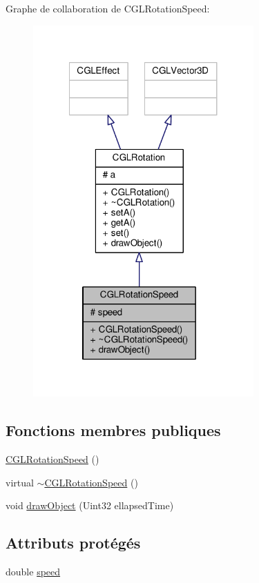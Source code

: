 Graphe de collaboration de C\-G\-L\-Rotation\-Speed\-:
\nopagebreak
\begin{figure}[H]
\begin{center}
\leavevmode
\includegraphics[width=239pt]{d1/dfb/class_c_g_l_rotation_speed__coll__graph}
\end{center}
\end{figure}
\subsection*{Fonctions membres publiques}
\begin{DoxyCompactItemize}
\item 
\hyperlink{class_c_g_l_rotation_speed_a6aed31b80ba1f7e050500469bf62e588}{C\-G\-L\-Rotation\-Speed} ()
\item 
virtual \hyperlink{class_c_g_l_rotation_speed_a7648604709da051825044630da6db987}{$\sim$\-C\-G\-L\-Rotation\-Speed} ()
\item 
void \hyperlink{class_c_g_l_rotation_speed_a6549d856fc0ad620fd1507744104797f}{draw\-Object} (Uint32 ellapsed\-Time)
\end{DoxyCompactItemize}
\subsection*{Attributs protégés}
\begin{DoxyCompactItemize}
\item 
double \hyperlink{class_c_g_l_rotation_speed_a5e9f478c8a0d828dac0ddee6777b45c4}{speed}
\end{DoxyCompactItemize}


